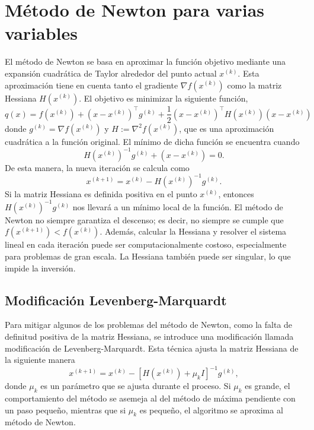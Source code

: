 \newpage

\section{Método de Newton para varias variables}

El método de Newton se basa en aproximar la función objetivo mediante una expansión cuadrática de Taylor alrededor del punto actual $x^{(k)}$. Esta aproximación tiene en cuenta tanto el gradiente $\nabla f\left(x^{(k)}\right)$ como la matriz Hessiana $H\left(x^{(k)}\right)$. El objetivo es minimizar la siguiente función,
$$q(x) = f\left(x^{(k)}\right) + \left(x - x^{(k)}\right)^{\top} g^{(k)} + \frac{1}{2} \left(x - x^{(k)}\right)^{\top} H\left(x^{(k)}\right) \left(x - x^{(k)}\right)$$
donde $g^{(k)} = \nabla f\left(x^{(k)}\right)$ y $H := \nabla^2 f\left(x^{(k)}\right)$, que es una aproximación cuadrática a la función original. El mínimo de dicha función se encuentra cuando
$$H\left(x^{(k)}\right)^{-1} g^{(k)} + \left(x - x^{(k)}\right) = 0.$$
De esta manera, la nueva iteración se calcula como
$$x^{(k + 1)} = x^{(k)} - H\left(x^{(k)}\right)^{-1} g^{(k)}.$$
Si la matriz Hessiana es definida positiva en el punto $x^{(k)}$, entonces $H\left(x^{(k)}\right)^{-1} g^{(k)}$ nos llevará a un mínimo local de la función. El método de Newton no siempre garantiza el descenso; es decir, no siempre se cumple que $f\left(x^{(k + 1)}\right) < f\left(x^{(k)}\right)$. Además, calcular la Hessiana y resolver el sistema lineal en cada iteración puede ser computacionalmente costoso, especialmente para problemas de gran escala. La Hessiana también puede ser singular, lo que impide la inversión.

\subsection{Modificación Levenberg-Marquardt}

Para mitigar algunos de los problemas del método de Newton, como la falta de definitud positiva de la matriz Hessiana, se introduce una modificación llamada modificación de Levenberg-Marquardt. Esta técnica ajusta la matriz Hessiana de la siguiente manera
$$x^{(k + 1)} = x^{(k)} - \left[H\left(x^{(k)}\right) + \mu_k I\right]^{-1} g^{(k)},$$
donde $\mu_k$ es un parámetro que se ajusta durante el proceso. Si $\mu_k$ es grande, el comportamiento del método se asemeja al del método de máxima pendiente con un paso pequeño, mientras que si $\mu_k$ es pequeño, el algoritmo se aproxima al método de Newton.

